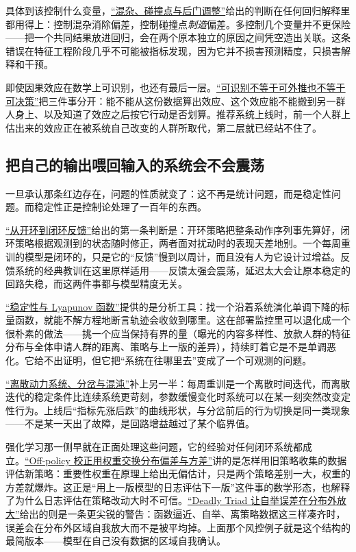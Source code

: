 具体到该控制什么变量，\hyperref[sec:13-Machine-Learning/12-Causal-Inference/03]{``混杂、碰撞点与后门调整''}给出的判断在任何回归解释里都用得上：控制混杂消除偏差，控制碰撞点\emph{制造}偏差。多控制几个变量并不更保险——把一个共同结果放进回归，会在两个原本独立的原因之间凭空造出关联。这条错误在特征工程阶段几乎不可能被指标发现，因为它并不损害预测精度，只损害解释和干预。

即使因果效应在数学上可识别，也还有最后一层。\hyperref[sec:13-Machine-Learning/12-Causal-Inference/06]{``可识别不等于可外推也不等于可决策''}把三件事分开：能不能从这份数据算出效应、这个效应能不能搬到另一群人身上、以及知道了效应之后按它行动是否划算。推荐系统上线时，前一个人群上估出来的效应正在被系统自己改变的人群所取代，第二层就已经站不住了。

\subsection{把自己的输出喂回输入的系统会不会震荡}

一旦承认那条红边存在，问题的性质就变了：这不再是统计问题，而是稳定性问题。而稳定性正是控制论处理了一百年的东西。

\hyperref[sec:16-Control-and-Reinforcement-Learning/01-Optimal-Control/01]{``从开环到闭环反馈''}给出的第一条判断是：开环策略把整条动作序列事先算好，闭环策略根据观测到的状态随时修正，两者面对扰动时的表现天差地别。一个每周重训的模型是闭环的，只是它的``反馈''慢到以周计，而且没有人为它设计过增益。反馈系统的经典教训在这里原样适用——反馈太强会震荡，延迟太大会让原本稳定的回路失稳，而这两件事都与模型精度无关。

\hyperref[sec:15-Differential-Equations-and-Dynamical-Systems/02-Stability-and-Dynamical-Systems/02]{``稳定性与 Lyapunov 函数''}提供的是分析工具：找一个沿着系统演化单调下降的标量函数，就能不解方程地断言轨迹会收敛到哪里。这在部署监控里可以退化成一个很朴素的做法——挑一个应当保持有界的量（曝光的内容多样性、放款人群的特征分布与全体申请人群的距离、策略与上一版的差异），持续盯着它是不是单调恶化。它给不出证明，但它把``系统在往哪里去''变成了一个可观测的问题。

\hyperref[sec:15-Differential-Equations-and-Dynamical-Systems/02-Stability-and-Dynamical-Systems/03]{``离散动力系统、分岔与混沌''}补上另一半：每周重训是一个离散时间迭代，而离散迭代的稳定条件比连续系统更苛刻，参数缓慢变化时系统可以在某一刻突然改变定性行为。上线后``指标先涨后跌''的曲线形状，与分岔前后的行为切换是同一类现象——不是某一天出了故障，是回路增益越过了某个临界值。

强化学习那一侧早就在正面处理这些问题，它的经验对任何闭环系统都成立。\hyperref[sec:16-Control-and-Reinforcement-Learning/02-Reinforcement-Learning/08]{``Off-policy 校正用权重交换分布偏差与方差''}讲的是怎样用旧策略收集的数据评估新策略：重要性权重在原理上给出无偏估计，只是两个策略差别一大，权重的方差就爆炸。这正是``用上一版模型的日志评估下一版''这件事的数学形态，也解释了为什么日志评估在策略改动大时不可信。\hyperref[sec:16-Control-and-Reinforcement-Learning/02-Reinforcement-Learning/06]{``Deadly Triad 让自举误差在分布外放大''}给出的则是一条更尖锐的警告：函数逼近、自举、离策略数据这三样凑齐时，误差会在分布外区域自我放大而不是被平均掉。上面那个风控例子就是这个结构的最简版本——模型在自己没有数据的区域自我确认。

